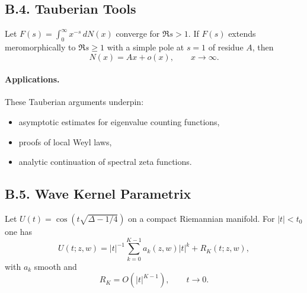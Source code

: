 %

%
\subsection*{B.4. Tauberian Tools}

\begin{lemma}\label{lem:B4}
Let $F(s) = \int_0^\infty x^{-s}\, dN(x)$ converge for $\Re s > 1$. 
If $F(s)$ extends meromorphically to $\Re s \geq 1$ with a simple pole 
at $s=1$ of residue $A$, then
\begin{equation}
  N(x) = Ax + o(x), \qquad x \to \infty.
\end{equation}
\end{lemma}

\paragraph{Applications.}
These Tauberian arguments underpin:
\begin{itemize}
  \item asymptotic estimates for eigenvalue counting functions,
  \item proofs of local Weyl laws,
  \item analytic continuation of spectral zeta functions.
\end{itemize}

%

%
\subsection*{B.5. Wave Kernel Parametrix}

\begin{proposition}\label{prop:B5}
Let $U(t) = \cos(t\sqrt{\Delta-1/4})$ on a compact Riemannian manifold.
For $|t| < t_0$ one has
\begin{equation}
  U(t;z,w) = |t|^{-1} \sum_{k=0}^{K-1} a_k(z,w) |t|^k + R_K(t;z,w),
\end{equation}
with $a_k$ smooth and 
\[
  R_K = O(|t|^{K-1}), \qquad t \to 0.
\]
\end{proposition}

